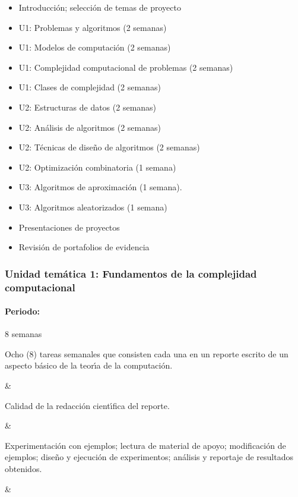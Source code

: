 \begin{itemize}[itemsep=-3pt]
\item{Introducci\'{o}n; selecci\'{o}n de temas de proyecto}
\item{U1: Problemas y algoritmos (2 semanas)}
\item{U1: Modelos de computaci\'{o}n (2 semanas)} 
\item{U1: Complejidad computacional de problemas (2 semanas)}
\item{U1: Clases de complejidad (2 semanas)} 
\item{U2: Estructuras de datos (2 semanas)} 
\item{U2: An\'{a}lisis de algoritmos (2 semanas)}
\item{U2: T\'{e}cnicas de dise\~{n}o de algoritmos (2 semanas)} 
\item{U2: Optimizaci\'{o}n combinatoria (1 semana)} 
\item{U3: Algoritmos de aproximaci\'{o}n (1 semana).}
\item{U3: Algoritmos aleatorizados (1 semana)} 
\item{Presentaciones de proyectos}
\item{Revisi\'{o}n de portafolios de evidencia}
\end{itemize}

\newpage

\subsubsection{Unidad tem\'{a}tica 1: Fundamentos de la complejidad computacional}

\paragraph{Periodo:} 8 semanas



Ocho (8) tareas semanales que consisten cada una en un reporte
escrito de un aspecto b\'{a}sico de la teor\'{\i}a de la computaci\'{o}n.

&

Calidad de la redacci\'{o}n cient\'{\i}fica del reporte.

&

Experimentaci\'{o}n con ejemplos; lectura de material de apoyo;
modificaci\'{o}n de ejemplos; dise\~{n}o y ejecuci\'{o}n de
experimentos; an\'{a}lisis y reportaje de resultados obtenidos.

&

